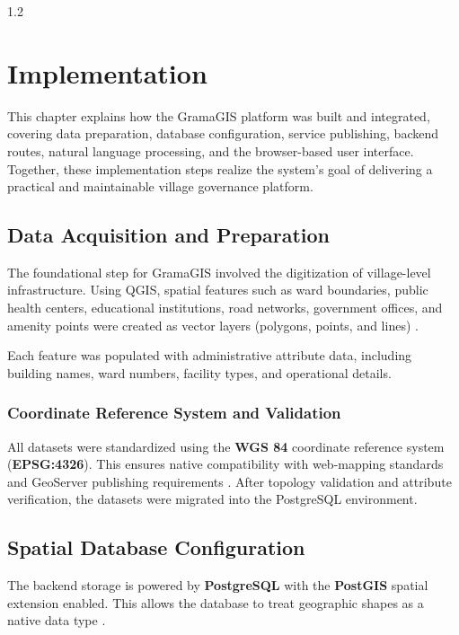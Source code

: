 ﻿\newpage
\thispagestyle{empty}
%
\begin{spacing}{1.2}
%
\chapter{Implementation}

This chapter explains how the GramaGIS platform was built and integrated, covering data preparation, database configuration, service publishing, backend routes, natural language processing, and the browser-based user interface. Together, these implementation steps realize the system's goal of delivering a practical and maintainable village governance platform.

\section{Data Acquisition and Preparation}

The foundational step for GramaGIS involved the digitization of village-level infrastructure. Using QGIS, spatial features such as ward boundaries, public health centers, educational institutions, road networks, government offices, and amenity points were created as vector layers (polygons, points, and lines) \cite{smart_panchayat2023}.

Each feature was populated with administrative attribute data, including building names, ward numbers, facility types, and operational details.

\subsection*{Coordinate Reference System and Validation}

All datasets were standardized using the \textbf{WGS 84} coordinate reference system (\textbf{EPSG:4326}). This ensures native compatibility with web-mapping standards and GeoServer publishing requirements \cite{fu2020webgis}. After topology validation and attribute verification, the datasets were migrated into the PostgreSQL environment.

\section{Spatial Database Configuration}

The backend storage is powered by \textbf{PostgreSQL} with the \textbf{PostGIS} spatial extension enabled. This allows the database to treat geographic shapes as a native data type \cite{postgis_in_action}.


\end{spacing}
